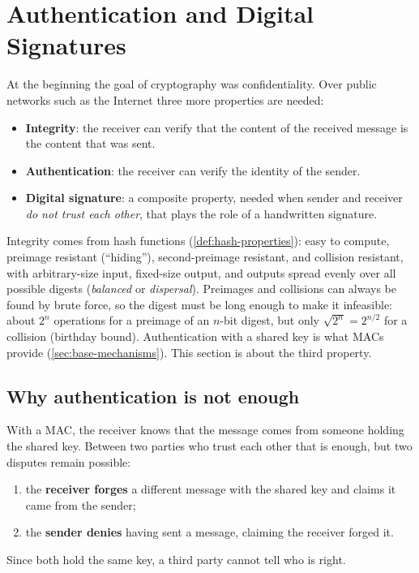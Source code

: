 \section{Authentication and Digital Signatures}
\label{sec:signatures}

At the beginning the goal of cryptography was confidentiality. Over public networks such as the Internet three more properties are needed:
\begin{itemize}
    \item \textbf{Integrity}: the receiver can verify that the content of the received message is the content that was sent.
    \item \textbf{Authentication}: the receiver can verify the identity of the sender.
    \item \textbf{Digital signature}: a composite property, needed when sender and receiver \emph{do not trust each other}, that plays the role of a handwritten signature.
\end{itemize}
Integrity comes from hash functions (\cref{def:hash-properties}): easy to compute, preimage resistant (\enquote{hiding}), second-preimage resistant, and collision resistant, with arbitrary-size input, fixed-size output, and outputs spread evenly over all possible digests (\emph{balanced} or \emph{dispersal}). Preimages and collisions can always be found by brute force, so the digest must be long enough to make it infeasible: about $2^n$ operations for a preimage of an $n$-bit digest, but only $\sqrt{2^n} = 2^{n/2}$ for a collision (birthday bound). Authentication with a shared key is what MACs provide (\cref{sec:base-mechanisms}). This section is about the third property.


\subsection{Why authentication is not enough}

With a MAC, the receiver knows that the message comes from someone holding the shared key. Between two parties who trust each other that is enough, but two disputes remain possible:
\begin{enumerate}
    \item the \textbf{receiver forges} a different message with the shared key and claims it came from the sender;
    \item the \textbf{sender denies} having sent a message, claiming the receiver forged it.
\end{enumerate}
Since both hold the same key, a third party cannot tell who is right.

